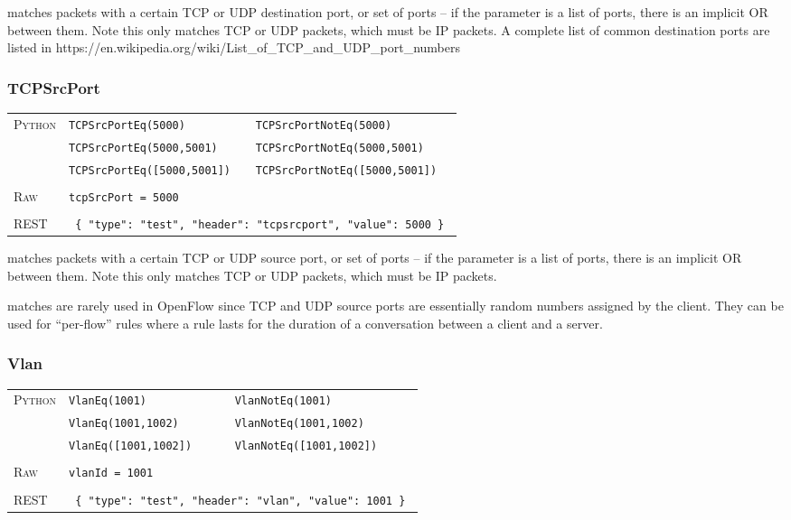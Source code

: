  matches packets with a certain TCP or UDP destination port, or set of ports -- if the 
parameter is a list of ports, there is an implicit OR between them.  Note this only matches TCP or UDP packets,
which must be IP packets.  A complete list of common destination ports are listed in 
https://en.wikipedia.org/wiki/List\_of\_TCP\_and\_UDP\_port\_numbers

\subsubsection{TCPSrcPort}

\bigskip
\begin{tabularx}{\linewidth}{lXX}
\textsc{Python}   & \texttt{TCPSrcPortEq(5000)}    & \texttt{TCPSrcPortNotEq(5000)} \\
    & \texttt{TCPSrcPortEq(5000,5001)}  & \texttt{TCPSrcPortNotEq(5000,5001)} \\
    & \texttt{TCPSrcPortEq([5000,5001])}  & \texttt{TCPSrcPortNotEq([5000,5001])} \\ \\
\textsc{Raw}    & \texttt{tcpSrcPort = 5000}     & \\ \\
\textsc{REST} & \multicolumn{2}{l}{\texttt{ \{ "type": "test", "header": "tcpsrcport", "value": 5000 \} }} 
\end{tabularx}

 matches packets with a certain TCP or UDP source port, or set of ports -- if the 
parameter is a list of ports, there is an implicit OR between them.  Note this only matches TCP or UDP packets,
which must be IP packets.  

 matches are rarely used in OpenFlow since TCP and UDP source ports are essentially random
numbers assigned by the client.  They can be used for ``per-flow'' rules where a rule lasts for the 
duration of a conversation between a client and a server.  

\subsubsection{Vlan}

\bigskip
\begin{tabularx}{\linewidth}{lXX}
\textsc{Python}   & \texttt{VlanEq(1001)}    & \texttt{VlanNotEq(1001)} \\
    & \texttt{VlanEq(1001,1002)}  & \texttt{VlanNotEq(1001,1002)} \\
    & \texttt{VlanEq([1001,1002])}  & \texttt{VlanNotEq([1001,1002])} \\ \\
\textsc{Raw}    & \texttt{vlanId = 1001}     & \\ \\
\textsc{REST} & \multicolumn{2}{l}{\texttt{ \{ "type": "test", "header": "vlan", "value": 1001 \} }} 
\end{tabularx}

